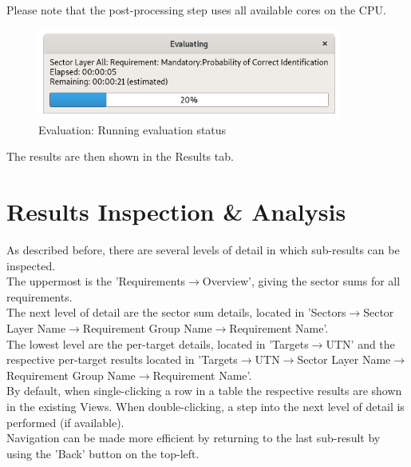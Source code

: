 Please note that the post-processing step uses all available cores on the CPU.

\begin{figure}[H]
  \centering 
    \includegraphics[width=10cm]{../screenshots/eval_eval_status.png}
  \caption{Evaluation: Running evaluation status}
\end{figure}

The results are then shown in the Results tab.

\section{Results Inspection \& Analysis}
\label{sec:eval_inspect}

As described before, there are several levels of detail in which sub-results can be inspected.\\

The uppermost is the 'Requirements$\rightarrow$Overview', giving the sector sums for all requirements. \\

The next level of detail are the sector sum details, located in 'Sectors$\rightarrow$Sector Layer Name$\rightarrow$Requirement Group Name$\rightarrow$Requirement Name'. \\

The lowest level are the per-target details, located in 'Targets$\rightarrow$UTN' and the respective per-target results located in 'Targets$\rightarrow$UTN$\rightarrow$Sector Layer Name$\rightarrow$Requirement Group Name$\rightarrow$Requirement Name'. \\

By default, when single-clicking a row in a table the respective results are shown in the existing Views. When double-clicking, a step into the next level of detail is performed (if available). \\

Navigation can be made more efficient by returning to the last sub-result by using the 'Back' button on the top-left.

